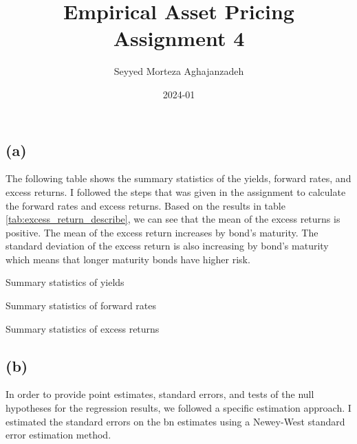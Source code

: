 \documentclass[hidelinks,12pt]{article}
\title{Empirical Asset Pricing \\ Assignment 4}
\author{Seyyed Morteza Aghajanzadeh}
\date{2024-01}
\begin{document}
\maketitle

\section{}
\subsection*{(a)}

The following table shows the summary statistics of the yields, forward rates, and excess returns. I followed the steps that was given in the assignment to calculate the forward rates and excess returns. Based on the results in table \ref{tab:excess_return_describe}, we can see that the mean of the excess returns is positive. The mean of the excess return increases by bond's maturity. The standard deviation of the excess return is also increasing by bond's maturity which means that longer maturity bonds have higher risk.

\begin{table}[htbp]
\centering
\caption{Summary statistics of yields}
\label{tab:yield_describe}
\resizebox{!}{!}{}
\end{table}

\begin{table}[htbp]
\centering
\caption{Summary statistics of forward rates}
\label{tab:forward_describe}
\resizebox{!}{!}{}
\end{table}

\begin{table}[htbp]
\centering
\caption{Summary statistics of excess returns}
\label{tab:excess_return_describe}
\resizebox{!}{!}{}
\end{table}

\FloatBarrier

\subsection*{(b)}

In order to provide point estimates, standard errors, and tests of the null hypotheses for the regression results, we followed a specific estimation approach. I estimated the standard errors on the bn estimates using a Newey-West standard error estimation method.
\end{document}
